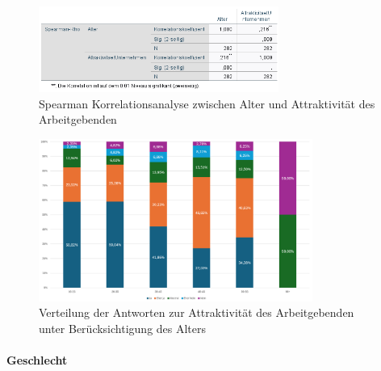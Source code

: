 \begin{figure}[h]
  \centering
  \includegraphics[width=0.7\textwidth]{04_Artefakte/01_Abbildungen/hypothese_5/korrelation_alter.png}
  \caption{Spearman Korrelationsanalyse zwischen Alter und Attraktivität des Arbeitgebenden}
  \label{fig:korrelation_alter}
\end{figure}



\begin{figure}[h]
  \centering
  \includegraphics[width=0.8\textwidth]{04_Artefakte/01_Abbildungen/hypothese_5/attraktivitaet_alter.png}
  \caption{Verteilung der Antworten zur Attraktivität des Arbeitgebenden unter Berücksichtigung des Alters}
  \label{fig:attraktivitaet_alter}
\end{figure}

\paragraph*{Geschlecht}

